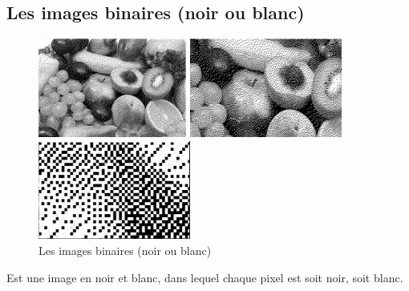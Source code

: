 \documentclass[12pt,a4paper]{report}
\numberwithin{equation}{subsection}
\numberwithin{equation}{section}
\begin{document}
\subsection{Les images binaires (noir ou blanc)}

 

\begin{figure}[!h]
    \centering
    \begin{minipage}[b]{0.3\textwidth}
        \includegraphics[height=3.25cm,width=3.5cm\textwidth]{noir1.png}
    \end{minipage}
    \begin{minipage}[b]{0.3\textwidth}
        \includegraphics[height=3.25cm,width=3.5cm\textwidth]{noir3.png}
    \end{minipage}
    \begin{minipage}[b]{0.3\textwidth}
        \includegraphics[height=3.25cm,width=3.5cm\textwidth]{noir2.png}
    \end{minipage}
    \caption{Les images binaires (noir ou blanc) }
\end{figure}
 



Est une image en noir et blanc, dans lequel chaque pixel est soit noir, soit blanc.
\end{document}
